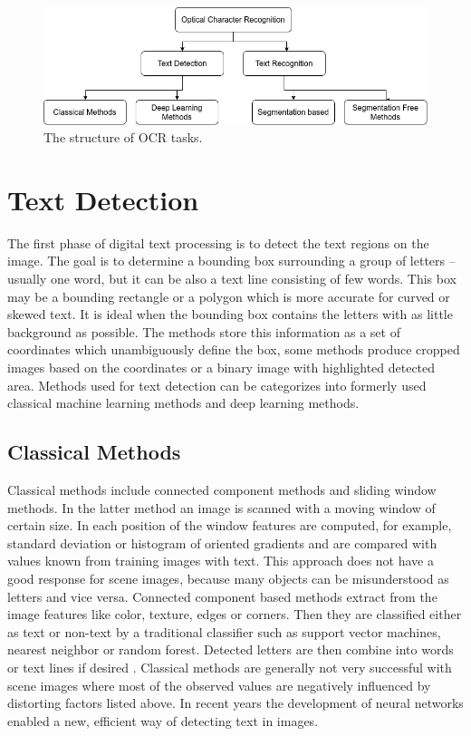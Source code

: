 \begin{figure}[hbtp]
    \centering
    \includegraphics[width=\textwidth-1.5cm]{obrazky/rozdeleni.png}
    \caption{The structure of OCR tasks.}
    \label{Im:rozdeleni}
\end{figure}

\section{Text Detection}

The first phase of digital text processing is to detect the text regions on the image. The goal is to determine a bounding box surrounding a group of letters -- usually one word, but it can be also a text line consisting of few words. This box may be a bounding rectangle or a polygon which is more accurate for curved or skewed text. It is ideal when the bounding box contains the letters with as little background as possible. The methods store this information as a set of coordinates which unambiguously define the box, some methods produce cropped images based on the coordinates or a binary image with highlighted detected area.%
Methods used for text detection can be categorizes into formerly used classical machine learning methods and deep learning methods. 

\subsection*{Classical Methods}

Classical methods include connected component methods and sliding window methods. In the latter method an image is scanned with a moving window of certain size. In each position of the window features are computed, for example, standard deviation or histogram of oriented gradients and are compared with values known from training images with text.    This approach does not have a good response for scene images, because many objects can be misunderstood as letters and vice versa. Connected component based methods extract from the image features like color, texture, edges or corners. Then they are classified either as text or non-text by a traditional classifier such as support vector machines, nearest neighbor or random forest. Detected letters are then combine into words or text lines if desired \cite{raisi2020text}. Classical methods are generally not very successful with scene images where most of the observed values are negatively influenced by distorting factors listed above. In recent years the development of neural networks enabled a new, efficient way of detecting text in images.


